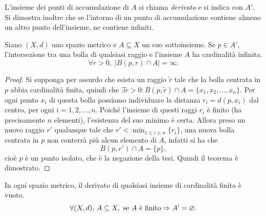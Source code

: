 L'insieme dei punti di accumulazione di $A$ si chiama \emph{derivato} e si indica con $A'$. Si dimostra inoltre che se l'intorno di un punto di accumulazione contiene almeno un altro punto dell'insieme, ne contiene infiniti.
\begin{teorema}
Siano $(X,d)$ uno spazio metrico e $A\subseteq X$ un suo sottoinsieme. Se $p\in A'$, l'intersezione tra una bolla di qualsiasi raggio e l'insieme $A$ ha cardinalità infinita.
\[
\forall r>0,\;|B(p,r)\cap A|=\infty.
\]
\end{teorema}
\begin{proof}
Si supponga per assurdo che esista un raggio $\tilde{r}$ tale che la bolla centrata in $p$ abbia cardinalità finita, quindi che $\exists\tilde{r}>0\colon B(p,\tilde{r})\cap A=\{x_1,x_2,\dots,x_n\}$. Per ogni punto $x_i$ di questa bolla possiamo individuare la distanza $r_i=d(p,x_i)$ dal centro, per ogni $i=1,2,\dots,n$. Poiché l'insieme di questi raggi $r_i$ è finito (ha precisamente $n$ elementi), l'esistenza del suo minimo è certa. Allora preso un nuovo raggio $r'$ qualunque tale che $r'<\min_{1\leq i\leq n}\{r_i\}$, una nuova bolla centrata in $p$ non conterrà più alcun elemento di $A$, infatti si ha che
\[
B(p,r')\cap A=\{p\},
\]
cioè $p$ è un punto isolato, che è la negazione della tesi. Quindi il teorema è dimostrato.
\end{proof}
\begin{corollario}
In ogni spazio metrico, il derivato di qualsiasi insieme di cardinalità finita è vuoto.
\[
\forall (X,d),\, A\subseteq X,\text{ se $A$ è finito}\Rightarrow A'=\varnothing.
\]
\end{corollario}
